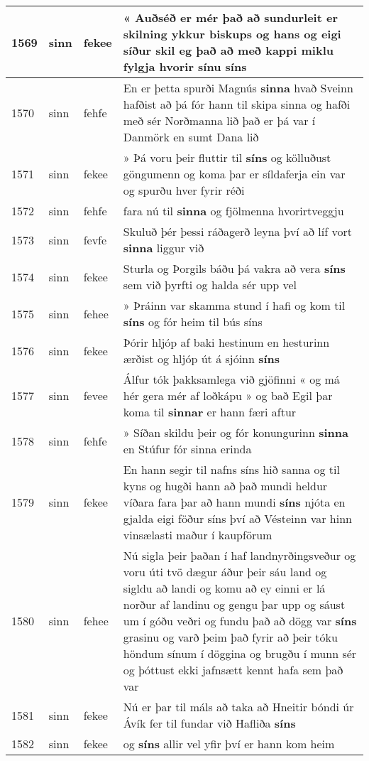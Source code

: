 \documentclass{article}
\begin{document}
\begin{longtable}{p{1cm}|p{1cm}|p{1cm}|p{13cm}}
\hline
1569&sinn&fekee&« Auðséð er mér það að sundurleit er skilning ykkur biskups og hans og eigi síður skil eg það að með kappi miklu fylgja hvorir sínu \textbf{síns} \\
\hline
1570&sinn&fehfe&En er þetta spurði Magnús \textbf{sinna} hvað Sveinn hafðist að þá fór hann til skipa sinna og hafði með sér Norðmanna lið það er þá var í Danmörk en sumt Dana lið\\
\hline
1571&sinn&fekee&» Þá voru þeir fluttir til \textbf{síns} og kölluðust göngumenn og koma þar er síldaferja ein var og spurðu hver fyrir réði\\
\hline
1572&sinn&fehfe&fara nú til \textbf{sinna} og fjölmenna hvorirtveggju\\
\hline
1573&sinn&fevfe&Skuluð þér þessi ráðagerð leyna því að líf vort \textbf{sinna} liggur við\\
\hline
1574&sinn&fekee&Sturla og Þorgils báðu þá vakra að vera \textbf{síns} sem við þyrfti og halda sér upp vel\\
\hline
1575&sinn&fehee&» Þráinn var skamma stund í hafi og kom til \textbf{síns} og fór heim til bús síns\\
\hline
1576&sinn&fekee&Þórir hljóp af baki hestinum en hesturinn ærðist og hljóp út á sjóinn \textbf{síns} \\
\hline
1577&sinn&fevee&Álfur tók þakksamlega við gjöfinni « og má hér gera mér af loðkápu » og bað Egil þar koma til \textbf{sinnar} er hann færi aftur\\
\hline
1578&sinn&fehfe&» Síðan skildu þeir og fór konungurinn \textbf{sinna} en Stúfur fór sinna erinda\\
\hline
1579&sinn&fekee&En hann segir til nafns síns hið sanna og til kyns og hugði hann að það mundi heldur víðara fara þar að hann mundi \textbf{síns} njóta en gjalda eigi föður síns því að Vésteinn var hinn vinsælasti maður í kaupförum\\
\hline
1580&sinn&fehee&Nú sigla þeir þaðan í haf landnyrðingsveður og voru úti tvö dægur áður þeir sáu land og sigldu að landi og komu að ey einni er lá norður af landinu og gengu þar upp og sáust um í góðu veðri og fundu það að dögg var \textbf{síns} grasinu og varð þeim það fyrir að þeir tóku höndum sínum í döggina og brugðu í munn sér og þóttust ekki jafnsætt kennt hafa sem það var\\
\hline
1581&sinn&fekee&Nú er þar til máls að taka að Hneitir bóndi úr Ávík fer til fundar við Hafliða \textbf{síns} \\
\hline
1582&sinn&fekee&og \textbf{síns} allir vel yfir því er hann kom heim\\

\end{longtable}
\end{document}
